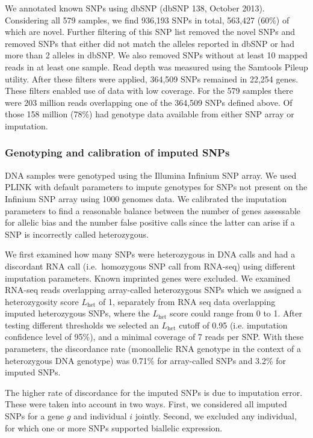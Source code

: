 \documentclass[letterpaper]{article}
\begin{document}
We annotated known SNPs using dbSNP (dbSNP 138, October 2013). Considering all
579 samples, we find 936,193 SNPs in total, 563,427 (60\%) of which are novel.
Further filtering of this SNP list removed the novel SNPs and removed SNPs
that either did not match the alleles reported in dbSNP or had more than 2
alleles in dbSNP. We also removed SNPs without at least 10 mapped reads in at
least one sample. Read depth was measured using the Samtools Pileup utility.
After these filters were applied, 364,509 SNPs remained in 22,254 genes. These
filters enabled use of data with low coverage.  For the 579
samples there were 203 million reads overlapping one of the
364,509 SNPs defined above.  Of those 158 million (78\%) had genotype data
available from either SNP array or imputation.

\subsubsection{Genotyping and calibration of imputed SNPs}

DNA samples were genotyped using the Illumina Infinium SNP array. We used
PLINK with default parameters to impute genotypes for SNPs not present on the
Infinium SNP array using 1000 genomes data.  We calibrated the
imputation parameters to find a reasonable balance between the number of genes
assessable for allelic bias and the number false positive
calls since the latter can arise if a SNP is
incorrectly called heterozygous.

We first examined how many SNPs were heterozygous in DNA calls and had a
discordant RNA call (i.e.~homozygous SNP call from RNA-seq) using different imputation
parameters. Known imprinted genes were excluded. We examined RNA-seq reads
overlapping array-called heterozygous SNPs which we assigned a heterozygosity
score \(L_\mathrm{het}\) of 1, separately from RNA seq data
overlapping imputed heterozygous SNPs, where the \(L_\mathrm{het}\) score could
range from 0 to 1.  After testing different thresholds
we selected an \(L_\mathrm{het}\) cutoff of 0.95 (i.e. imputation confidence
level of 95\%), and a minimal coverage of 7 reads per SNP. With these
parameters, the discordance rate (monoallelic RNA genotype in the context of a
heterozygous DNA genotype) was 0.71\% for array-called SNPs and 3.2\% for
imputed SNPs.

The higher rate of discordance for the imputed SNPs
is due to imputation error.  These were taken into
account in two ways.
First, we considered all imputed SNPs for a gene \(g\) and individual \(i\)
jointly.  Second, we excluded
any individual, for which one or more SNPs supported biallelic
expression.
\end{document}
